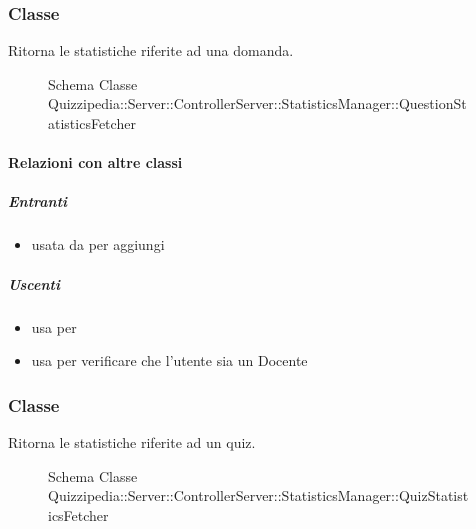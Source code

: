 \subsubsection{Classe }
Ritorna le statistiche riferite ad una domanda.
\begin{figure}[H]
\centering
\noindent{}
\caption[Schema Classe QuestionStatisticsFetcher]{Schema Classe Quizzipedia::Server::ControllerServer::StatisticsManager::QuestionStatisticsFetcher}
\end{figure}
\paragraph{Relazioni con altre classi}
\subparagraph{Entranti}
\begin{itemize}
\item usata da  per aggiungi
\end{itemize}
\subparagraph{Uscenti}
\begin{itemize}
\item usa  per 
\item usa  per verificare che l'utente sia un Docente
\end{itemize}
\subsubsection{Classe }
Ritorna le statistiche riferite ad un quiz.
\begin{figure}[H]
\centering
\noindent{}
\caption[Schema Classe QuizStatisticsFetcher]{Schema Classe Quizzipedia::Server::ControllerServer::StatisticsManager::QuizStatisticsFetcher}
\end{figure}
